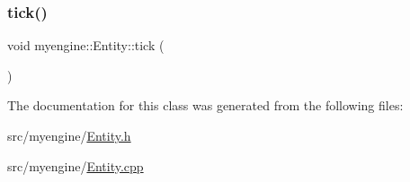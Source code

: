 \subsubsection{\texorpdfstring{tick()}{tick()}}
{\footnotesize\ttfamily void myengine\+::\+Entity\+::tick (\begin{DoxyParamCaption}{ }\end{DoxyParamCaption})}



The documentation for this class was generated from the following files\+:\begin{DoxyCompactItemize}
\item 
src/myengine/\hyperlink{_entity_8h}{Entity.\+h}\item 
src/myengine/\hyperlink{_entity_8cpp}{Entity.\+cpp}\end{DoxyCompactItemize}
